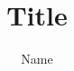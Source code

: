 \author{Name}
\title{Title}
\def\unitcode{Unit Code}
\def\unitname{Unit Name}
\def\studentnumber{Student Number}